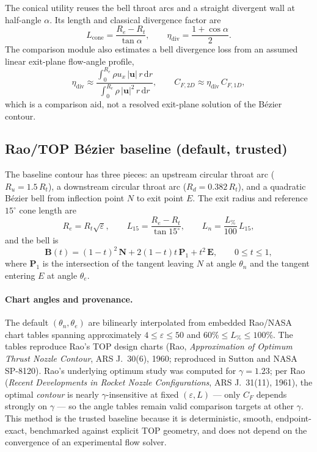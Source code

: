 \documentclass[11pt]{article}
\begin{document}
The conical utility reuses the bell throat arcs and a straight divergent wall
at half-angle $\alpha$. Its length and classical divergence factor are
\begin{equation}
L_{\mathrm{cone}}=\frac{R_e-R_t}{\tan\alpha},
\qquad
\eta_{\mathrm{div}}=\frac{1+\cos\alpha}{2} .
\end{equation}
The comparison module also estimates a bell divergence loss from an assumed
linear exit-plane flow-angle profile,
\begin{equation}
\eta_{\mathrm{div}}\approx
\frac{\displaystyle\int_0^{R_e}\rho u_x\,|\mathbf{u}|\,r\,\mathrm{d}r}
{\displaystyle\int_0^{R_e}\rho\,|\mathbf{u}|^2\,r\,\mathrm{d}r},
\qquad
C_{F,2D}\approx\eta_{\mathrm{div}}\,C_{F,1D},
\end{equation}
which is a comparison aid, not a resolved exit-plane solution of the B\'ezier
contour.

\subsection{Rao/TOP B\'ezier baseline (default, trusted)}

The baseline contour has three pieces: an upstream circular throat arc
($R_u = 1.5\,R_t$), a downstream circular throat arc ($R_d = 0.382\,R_t$),
and a quadratic B\'ezier bell from inflection point $N$ to exit point $E$.
The exit radius and reference $15^\circ$ cone length are
\begin{equation}
R_e=R_t\sqrt{\varepsilon},
\qquad
L_{15}=\frac{R_e-R_t}{\tan 15^\circ},
\qquad
L_n=\frac{L_{\%}}{100}\,L_{15},
\end{equation}
and the bell is
\begin{equation}
\mathbf{B}(t)=(1-t)^2\,\mathbf{N}+2(1-t)t\,\mathbf{P}_1+t^2\,\mathbf{E},
\qquad 0\le t\le 1,
\end{equation}
where $\mathbf{P}_1$ is the intersection of the tangent leaving $N$ at angle
$\theta_n$ and the tangent entering $E$ at angle $\theta_e$.

\paragraph{Chart angles and provenance.}
The default $(\theta_n,\theta_e)$ are bilinearly interpolated from embedded
Rao/NASA chart tables spanning approximately $4\le\varepsilon\le 50$ and
$60\%\le L_{\%}\le 100\%$. The tables reproduce Rao's TOP design charts
(Rao, \emph{Approximation of Optimum Thrust Nozzle Contour}, ARS J.\ 30(6),
1960; reproduced in Sutton and NASA SP-8120). Rao's underlying optimum study
was computed for $\gamma = 1.23$; per Rao (\emph{Recent Developments in
Rocket Nozzle Configurations}, ARS J.\ 31(11), 1961), the optimal
\emph{contour} is nearly $\gamma$-insensitive at fixed $(\varepsilon, L)$ ---
only $C_F$ depends strongly on $\gamma$ --- so the angle tables remain valid
comparison targets at other $\gamma$. This method is the trusted baseline
because it is deterministic, smooth, endpoint-exact, benchmarked against
explicit TOP geometry, and does not depend on the convergence of an
experimental flow solver.
\end{document}
